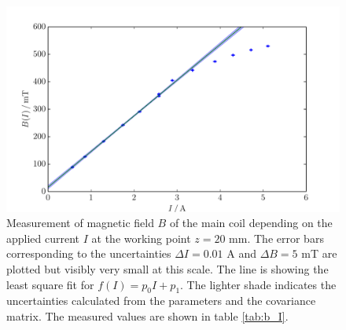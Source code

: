 \begin{figure}
\includegraphics[width=\textwidth]{figures/b_I.pdf}
\caption{   
    Measurement of magnetic field $B$ of the main coil depending on the applied current 
    $I$ at the working point $z = 20$ mm. The error bars corresponding 
    to the uncertainties $\Delta I = 0.01$ A 
    and $\Delta B = 5$ mT are plotted but visibly very small at this scale. 
    The line is showing the least square fit for $f(I) = p_0 I + p_1$. The 
    lighter shade indicates the uncertainties calculated from the parameters 
    and the covariance matrix. 
    The measured values are shown in table \ref{tab:b_I}.
    }
\label{fig:b_I}
\end{figure}

